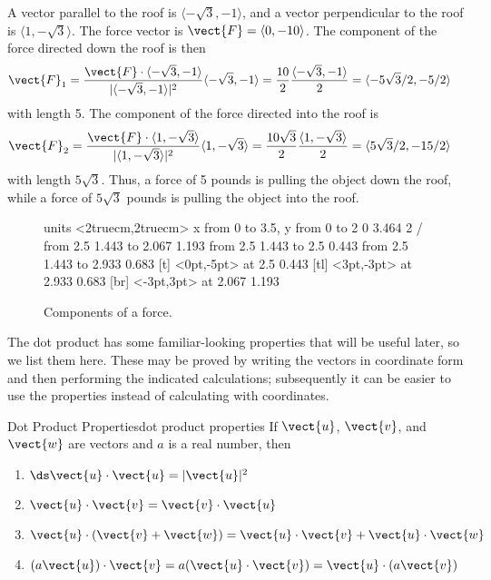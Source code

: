 \begin{solution}
A vector parallel to the roof is $\langle-\sqrt3,-1\rangle$,
and a vector perpendicular to the roof is
$\langle 1,-\sqrt3\rangle$.  The force vector is $\vect{F}=\langle
0,-10\rangle$. The component of the force directed down the roof is
then
\begin{align*}
  \vect{F}_1&={\vect{F}\cdot
  \langle-\sqrt3,-1\rangle\over|\langle-\sqrt3,-1\rangle|^2}
  \langle-\sqrt3,-1\rangle
  ={10\over 2}{\langle-\sqrt3,-1\rangle\over2}=
  \langle -5\sqrt3/2,-5/2\rangle
\end{align*}
with length 5.  The component of the force directed into the roof is
\begin{align*}
  \vect{F}_2&={\vect{F}\cdot
  \langle1,-\sqrt3\rangle\over|\langle1,-\sqrt3\rangle|^2}
  \langle1,-\sqrt3\rangle
={10\sqrt3\over 2}{\langle1,-\sqrt3\rangle\over2}=
\langle 5\sqrt3/2,-15/2\rangle\cr
\end{align*}
with length $5\sqrt3$. Thus, a force of 5 pounds is pulling the object
down the roof, while a force of $5\sqrt3$ pounds is pulling the object
into the roof.
\end{solution}

\begin{figure}[H]
\centerline{
\vbox{\beginpicture
\normalgraphs
\setcoordinatesystem units <2truecm,2truecm>
\setplotarea x from 0 to 3.5, y from 0 to 2
 0 3.464 2 /
\arrow <4pt> [0.35, 1] from 2.5 1.443 to 2.067 1.193
\arrow <4pt> [0.35, 1] from 2.5 1.443 to 2.5 0.443
\arrow <4pt> [0.35, 1] from 2.5 1.443 to 2.933 0.683
 [t] <0pt,-5pt> at 2.5 0.443
 [tl] <3pt,-3pt> at 2.933 0.683
 [br] <-3pt,3pt> at 2.067 1.193
\endpicture}}
\caption{Components of a force. \label{fig:components of force}}
\end{figure}

The dot product has some familiar-looking properties that will be
useful later, so we list them here. These may be proved by writing the
vectors in coordinate form and then performing the indicated
calculations; subsequently it can be easier to use the properties
instead of calculating with coordinates.

\begin{theorem}{Dot Product Properties}{dot product properties}
If $\vect{u}$, $\vect{v}$, and $\vect{w}$ are vectors and $a$ is a real
number, then
\begin{enumerate}
	\item	$\ds \vect{u}\cdot\vect{u} = |\vect{u}|^2$
	\item	$\vect{u}\cdot\vect{v} = \vect{v}\cdot\vect{u}$
	\item	$\vect{u}\cdot(\vect{v}+\vect{w}) = 
	\vect{u}\cdot\vect{v}+\vect{u}\cdot\vect{w}$
	\item	$(a\vect{u})\cdot\vect{v}=a(\vect{u}\cdot\vect{v})
	=\vect{u}\cdot(a\vect{v})$
\end{enumerate}
\end{theorem}


